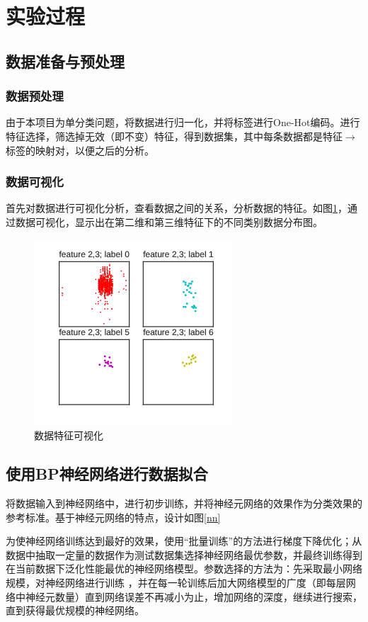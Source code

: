 \documentclass{exam}
\begin{document}
\section{实验过程}

\subsection{数据准备与预处理}
\subsubsection{数据预处理}
由于本项目为单分类问题，将数据进行归一化，并将标签进行One-Hot编码。进行特征选择，筛选掉无效（即不变）特征，得到数据集，其中每条数据都是特征$\rightarrow$标签的映射对，以便之后的分析。
\subsubsection{数据可视化}
首先对数据进行可视化分析，查看数据之间的关系，分析数据的特征。如图\ref{feat}，通过数据可视化，显示出在第二维和第三维特征下的不同类别数据分布图。

\begin{figure}
\centering
    \includegraphics[width=0.4\hsize]{fig/cd/data_features.eps.png}
    \caption{数据特征可视化}
    \label{feat}
\end{figure}

\subsection{使用BP神经网络进行数据拟合}
将数据输入到神经网络中，进行初步训练，并将神经元网络的效果作为分类效果的参考标准。基于神经元网络的特点，设计如图\ref{nn}

为使神经网络训练达到最好的效果，使用“批量训练”的方法进行梯度下降优化；从数据中抽取一定量的数据作为测试数据集选择神经网络最优参数，并最终训练得到在当前数据下泛化性能最优的神经网络模型。参数选择的方法为：先采取最小网络规模，对神经网络进行训练
，并在每一轮训练后加大网络模型的广度（即每层网络中神经元数量）直到网络误差不再减小为止，增加网络的深度，继续进行搜索，直到获得最优规模的神经网络。
\end{document}
